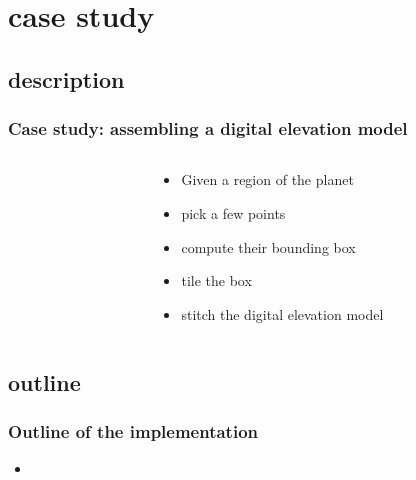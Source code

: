%
%

\section{case study}
\subsection{description}

\begin{frame}
  \frametitle{Case study: assembling a digital elevation model}
%
%
  \begin{columns}[c]
    \begin{column}{.4\textwidth}
    \end{column}
    \begin{column}{.5\textwidth}
      \begin{itemize}
      \item<1-> Given a region of the planet
      \item<2-> pick a few points
      \item<3-> compute their bounding box
      \item<4-> tile the box
      \item<5-> stitch the digital elevation model
      \end{itemize}
    \end{column}
  \end{columns}
%
\end{frame}

\subsection{outline}

\begin{frame}
%
  \frametitle{Outline of the implementation}
%
%
  \begin{itemize}
%
  \item
%
  \end{itemize}
%
\end{frame}




